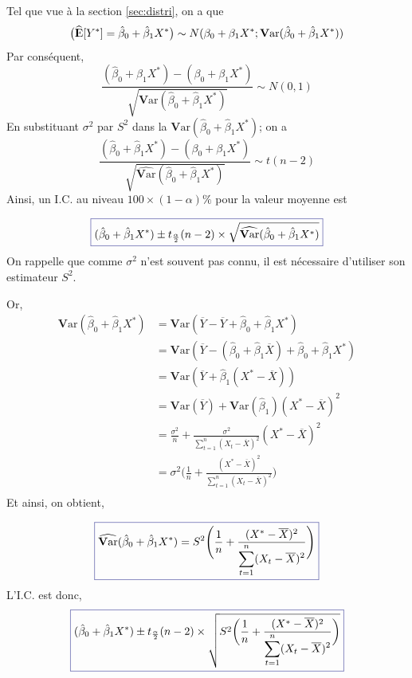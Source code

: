 \documentclass[11pt,french]{report}
\newcommand{\E}{{\rm I\kern-.3em E}}
\newcommand{\Var}{\mathrm{\textbf{V}ar}}
\begin{document}
Tel que vue à la section \ref{sec:distri}, on a que
$$
\big(\widehat{\E}[Y^*] = \hat{\beta}_0 + \hat{\beta}_1X^* \big) \sim N(\beta_0 + \beta_1X^*; \Var( \hat{\beta}_0 + \hat{\beta}_1X^*))
$$
Par conséquent,
$$
\frac{(\hat{\beta}_0 + \hat{\beta}_1X^*) - (\beta_0 + \beta_1X^*)}{\sqrt{\Var( \hat{\beta}_0 + \hat{\beta}_1X^*)}} \sim N(0,1)
$$
En substituant $\sigma^2$ par $S^2$ dans la $\Var(\hat{\beta}_0 + \hat{\beta}_1X^*)$; on a
$$
\frac{(\hat{\beta}_0 + \hat{\beta}_1X^*) - (\beta_0 + \beta_1X^*)}{\sqrt{\widehat{\Var}( \hat{\beta}_0 + \hat{\beta}_1X^*)}} \sim t(n-2)
$$
Ainsi, un I.C. au niveau $100 \times(1 -\alpha)\%$ pour la valeur moyenne est

\begin{equation}
\label{eq:IC}
\color{Blue}
\boxed{\color{black}
(\hat{\beta}_0 + \hat{\beta}_1X^*)  \pm t_{\frac{\alpha}{2}}(n-2)\times \sqrt{\widehat{\Var}( \hat{\beta}_0 + \hat{\beta}_1X^*)}
}
\end{equation}
On rappelle que comme $\sigma^2$ n'est souvent pas connu, il est nécessaire d'utiliser son estimateur $S^2$.

Or, 
\begin{align*}
\Var(\hat{\beta}_0 + \hat{\beta}_1X^*)  &= \Var(\overline{Y} - \overline{Y} + \hat{\beta}_0 + \hat{\beta}_1X^*) \\
&= \Var(\overline{Y} - (\hat{\beta}_0 + \hat{\beta}_1\overline{X}) + \hat{\beta}_0 + \hat{\beta}_1X^*) \\
&= \Var(\overline{Y} + \hat{\beta}_1( X^* - \overline{X})) \\
&= \Var(\overline{Y}) + \Var(\hat{\beta}_1)( X^* - \overline{X})^2 \\
&= \frac{\sigma^2}{n} + \frac{\sigma^2}{\displaystyle\sum_{t=1}^n (X_t - \overline{X})^2}(X^* - \overline{X})^2 \\
&=\sigma^2 \Bigg(\frac{1}{n} + \frac{(X^* - \overline{X})^2 }{\displaystyle\sum_{t=1}^n (X_t - \overline{X})^2}\Bigg)  \\
\end{align*}
Et ainsi, on obtient,

\begin{equation}
\label{eq:var*}
\color{Blue}
\boxed{\color{black}
\widehat{\Var}(\hat{\beta}_0 + \hat{\beta}_1X^*) = S^2 \Bigg(\frac{1}{n} + \frac{(X^* - \overline{X})^2 }{\displaystyle\sum_{t=1}^n (X_t - \overline{X})^2}\Bigg)  
}
\end{equation}
L'I.C. est donc,
\begin{equation}
\label{eq:IC2}
\color{Blue}
\boxed{\color{black}
(\hat{\beta}_0 + \hat{\beta}_1X^*) \pm t_{\frac{\alpha}{2}}(n-2)\times \sqrt{S^2 \bigg(\frac{1}{n} + \frac{(X^* - \overline{X})^2 }{\displaystyle\sum_{t=1}^n (X_t - \overline{X})^2}\bigg)}  
}
\end{equation}
\end{document}
